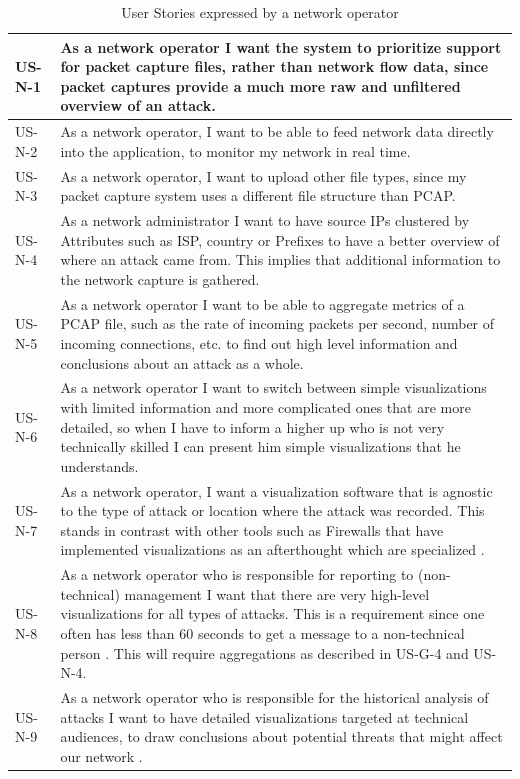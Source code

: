\begin{table}[]
\begin{tabular}{|p{1.6cm}|p{12cm}|}
US-N-1         & As a network operator I want the system to prioritize support for packet capture files, rather than network flow data, since packet captures provide a much more raw and unfiltered overview of an attack. \\ \hline
US-N-2        & As a network operator, I want to be able to feed network data directly into the application, to monitor my network in real time.\\ \hline
US-N-3        & As a network operator, I want to upload other file types, since my packet capture system uses a different file structure than PCAP.\\ \hline
US-N-4        & As a network administrator I want to have source IPs clustered by Attributes such as ISP, country or Prefixes to have a better overview of where an attack came from. This implies that additional information to the network capture is gathered.\\ \hline
US-N-5         & As a network operator I want to be able to aggregate metrics of a PCAP file, such as the rate of incoming packets per second, number of incoming connections, etc. to find out high level information and conclusions about an attack as a whole.\\ \hline
US-N-6        & As a network operator I want to switch between simple visualizations with limited information and more complicated ones that are more detailed, so when I have to inform a higher up who is not very technically skilled I can present him simple visualizations that he understands.\\ \hline
US-N-7       & As a network operator, I want a visualization software that is agnostic to the type of attack or location where the attack was recorded. This stands in contrast with other tools such as Firewalls that have implemented visualizations as an afterthought which are specialized \cite{appliedsecurityvisualization}.\\ \hline
US-N-8       & As a network operator who is responsible for reporting to (non-technical) management I want that there are very high-level visualizations for all types of attacks. This is a requirement since one often has less than 60 seconds to get a message to a non-technical person \cite{appliedsecurityvisualization}. This will require aggregations as described in US-G-4 and US-N-4. \\ \hline
US-N-9       & As a network operator who is responsible for the historical analysis of attacks I want to have detailed visualizations targeted at technical audiences, to draw conclusions about potential threats that might affect our network \cite{appliedsecurityvisualization}.\\ \hline

\end{tabular}
\caption{User Stories expressed by a network operator}
\label{table:us-operator}
\end{table} 


